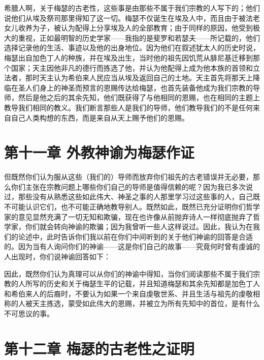 希腊人啊，关于梅瑟的古老性，这些事是由那些不属于我们宗教的人写下的；他们说他们从埃及祭司那里得知了这一切。梅瑟不仅诞生在埃及人中，而且由于被法老女儿收养为子，被认为配得上分享埃及人的全部教育；由于同样的原因，他受到极大的重视，正如最明智的历史学家——我指的是斐罗和若瑟夫——所记载的，他们选择记录他的生活、事迹以及他的出身地位。因为他们在叙述犹太人的历史时说，梅瑟出自加色丁人的种族，并在埃及出生，当时他的祖先因饥荒从腓尼基迁移到那个国家；天主因他非凡的德行而拣选了他，并认为他配得上成为他本族的首领和立法者，那时天主认为希伯来人民应当从埃及返回自己的土地。天主首先将那天上降临在圣人们身上的神圣而预言的恩赐传达给梅瑟，也首先装备他成为我们宗教的导师，然后是他之后的其余先知，他们既获得了与他相同的恩赐，也在相同的主题上教导我们相同的教义。我们断言那些人是我们的导师，他们教导我们的不是任何来自自己人类构想的东西，而是来自从天上赐予他们的恩赐。\par


\section{第十一章  外教神谕为梅瑟作证}

但既然你们认为服从这些（我们的）导师而放弃你们祖先的古老错误并无必要，那么你们主张在宗教问题上哪些你们自己的导师是值得信赖的呢？因为我已多次说过，那些没有从熟悉这些如此伟大、神圣之事的人那里学习过这些事的人，自己既不可能认识它们，也不可能正确地教导别人。既然如此，既然已充分证明你们哲学家的意见显然充满了一切无知和欺骗，现在也许像从前抛弃诗人一样彻底抛弃了哲学家，你们就会转向神谕的欺骗；因为我曾听一些人这样说过。因此，我认为在我们的论述中，此时告诉你们我以前在你们中间听到的关于他们神谕的回答是合适的。因为当有人询问你们的神谕——这是你们自己的故事——究竟何时曾有虔诚的人出现时，你们说神谕回答如下：\par

因此，既然你们认为真理可以从你们的神谕中得知，当你们阅读那些不属于我们宗教的人所写的历史和关于梅瑟生平的记载，并且知道梅瑟和其余先知都是加色丁人和希伯来人的后裔时，不要认为如果一个来自虔敬世系、并且生活与祖先的虔敬相称的人被天主拣选，蒙受如此伟大的恩赐，并被立为所有先知中的首位，是有什么不可思议的事。\par


\section{第十二章 梅瑟的古老性之证明}

